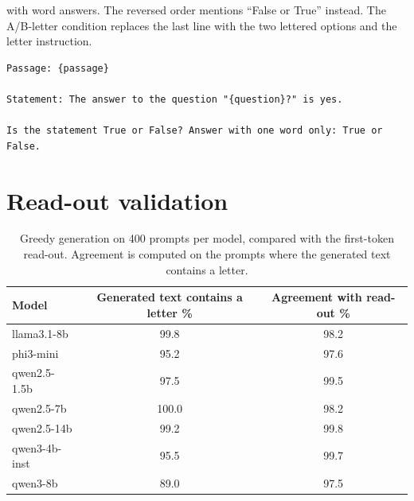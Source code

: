 \boolq with word answers. The reversed order mentions ``False or True'' instead. The A/B-letter condition replaces the last line with the two lettered options and the letter instruction.

\begin{lstlisting}
Passage: {passage}

Statement: The answer to the question "{question}?" is yes.

Is the statement True or False? Answer with one word only: True or False.
\end{lstlisting}

\section{Read-out validation}
\label{app:readout}

\begin{table}[h]
    \centering
    \caption{Greedy generation on 400 \mmlu prompts per model, compared with the first-token read-out. Agreement is computed on the prompts where the generated text contains a letter.}
    \label{tab:readout}
    \small
    \begin{tabular}{@{}lcc@{}}
        \toprule
        \textbf{Model} & \textbf{Generated text contains a letter \%} & \textbf{Agreement with read-out \%} \\
        \midrule
        llama3.1-8b   & 99.8  & 98.2 \\
        phi3-mini     & 95.2  & 97.6 \\
        qwen2.5-1.5b  & 97.5  & 99.5 \\
        qwen2.5-7b    & 100.0 & 98.2 \\
        qwen2.5-14b   & 99.2  & 99.8 \\
        qwen3-4b-inst & 95.5  & 99.7 \\
        qwen3-8b      & 89.0  & 97.5 \\
        \bottomrule
    \end{tabular}
\end{table}
